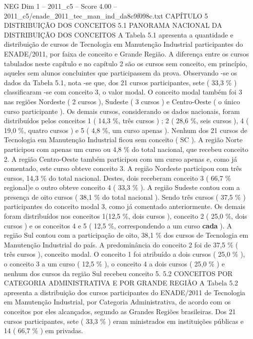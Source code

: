 \begin{textsample}{NEG Dim 1 – 2011\_c5 – Score 4.00 – 2011\_c5/enade\_2011\_tec\_man\_ind\_da8c9f098c.txt}  \label{ex:f1_neg_315}
CAPÍTULO 5 DISTRIBUIÇÃO DOS CONCEITOS 5.1 PANORAMA NACIONAL DA DISTRIBUIÇÃO DOS CONCEITOS A Tabela 5.1 apresenta a quantidade e distribuição de cursos de Tecnologia em Manutenção Industrial participantes do ENADE/2011, por faixa de conceito e Grande Região.
A diferença entre os cursos tabulados neste capítulo e no capítulo 2 são os cursos sem conceito, em princípio, aqueles sem alunos concluintes que participassem da prova.
Observando -se os dados da Tabela 5.1, nota -se que, dos 21 cursos participantes, sete ( 33,3 \% ) classificaram -se com conceito 3, o valor modal.
O conceito modal também foi 3 nas regiões Nordeste ( 2 cursos ), Sudeste ( 3 cursos ) e Centro-Oeste ( o único curso participante ).
Os demais cursos, considerando os dados nacionais, foram distribuídos pelos conceitos 1 ( 14,3 \%, três cursos ) ; 2 ( 28,6 \%, seis cursos ), 4 ( 19,0 \%, quatro cursos ) e 5 ( 4,8 \%, um curso apenas ).
Nenhum dos 21 cursos de Tecnologia em Manutenção Industrial ficou sem conceito ( SC ).
A região Norte participou com apenas um curso ou 4,8 \% do total nacional, que recebeu conceito 2.
A região Centro-Oeste também participou com um curso apenas e, como já comentado, este curso obteve conceito 3.
A região Nordeste participou com três cursos, 14,3 \% do total nacional.
Destes, dois receberam conceito 3 ( 66,7 \% regional)e o outro obteve conceito 4 ( 33,3 \% ).
A região Sudeste contou com a presença de oito cursos ( 38,1 \% do total nacional ).
Sendo três cursos ( 37,5 \% ) participantes do conceito modal 3, como já comentado anteriormente.
Os demais foram distribuídos nos conceitos 1(12,5 \%, dois cursos ), conceito 2 ( 25,0 \%, dois cursos ) e os conceitos 4 e 5 ( 12,5 \%, correspondendo a um curso \textbf{cada} ).
A região Sul contou com a participação de oito, 38,1 \% dos cursos de Tecnologia em Manutenção Industrial do país.
A predominância do conceito 2 foi de 37,5 \% ( três cursos ), conceito modal.
O conceito 1 foi atribuído a dois cursos ( 25,0 \% ), o conceito 3 a um curso ( 12,5 \% ), o conceito 4 a dois cursos ( 25,0 \% ) e nenhum dos cursos da região Sul recebeu conceito 5. 5.2 CONCEITOS POR CATEGORIA ADMINISTRATIVA E POR GRANDE REGIÃO A Tabela 5.2 apresenta a distribuição dos cursos participantes do ENADE/2011 de Tecnologia em Manutenção Industrial, por Categoria Administrativa, de acordo com os conceitos por eles alcançados, segundo as Grandes Regiões brasileiras.
Dos 21 cursos participantes, sete ( 33,3 \% ) eram ministrados em instituições públicas e 14 ( 66,7 \% ) em privadas.

\end{textsample}

